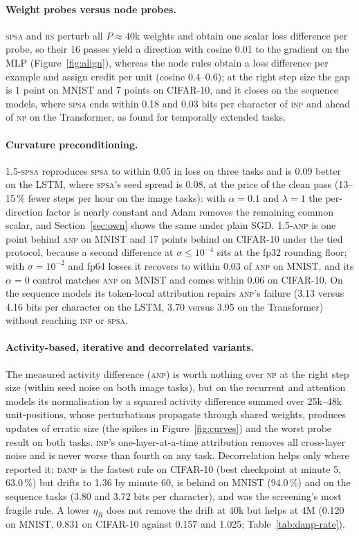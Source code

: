 \documentclass{article}
\newcommand{\method}[1]{\textsc{#1}}
\newcommand{\SPSA}{\method{spsa}}
\newcommand{\SPSAb}{\method{1.5-spsa}}
\newcommand{\RS}{\method{rs}}
\newcommand{\NP}{\method{np}}
\newcommand{\ANP}{\method{anp}}
\newcommand{\ANPb}{\method{1.5-anp}}
\newcommand{\INP}{\method{inp}}
\newcommand{\DANP}{\method{danp}}
\begin{document}
\paragraph{Weight probes versus node probes.}
\SPSA{} and \RS{} perturb all $P\approx40$k weights and obtain one scalar loss
difference per probe, so their 16 passes yield a direction with cosine 0.01 to the
gradient on the MLP (Figure~\ref{fig:align}), whereas the node rules obtain a loss
difference per example and assign credit per unit (cosine 0.4--0.6); at the right step size the gap is 1 point on MNIST and 7 points on CIFAR-10, and it closes on the sequence models, where \SPSA{} ends within 0.18
and 0.03 bits per character of \INP{} and ahead of \NP{} on the Transformer, as
\citet{zuge2023weight} found for temporally extended tasks.

\paragraph{Curvature preconditioning.}
\SPSAb{} reproduces \SPSA{} to within 0.05 in loss on three tasks and is 0.09 better
on the LSTM, where \SPSA{}'s seed spread is 0.08, at the price of the clean pass
(13--15\,\% fewer steps per hour on the image tasks): with
$\alpha=0.1$ and $\lambda=1$ the per-direction factor is nearly constant and Adam
removes the remaining common scalar, and Section~\ref{sec:own} shows the same under
plain SGD. \ANPb{} is one point behind \ANP{} on MNIST and 17 points behind on CIFAR-10 under
the tied protocol, because a second difference at $\sigma\le10^{-4}$ sits at the fp32
rounding floor; with $\sigma=10^{-2}$ and fp64
losses it recovers to within 0.03 of \ANP{} on MNIST, and its $\alpha=0$ control
matches \ANP{} on MNIST and comes within 0.06 on CIFAR-10. On the sequence models its token-local attribution
repairs \ANP{}'s failure (3.13 versus 4.16 bits per character on the LSTM, 3.70 versus
3.95 on the Transformer) without reaching \INP{} or \SPSA{}.

\paragraph{Activity-based, iterative and decorrelated variants.}
The measured activity difference (\ANP{}) is worth nothing over \NP{} at the right
step size (within seed noise on both image tasks), but on the recurrent and attention models its normalisation by a squared
activity difference summed over 25k--48k unit-positions, whose perturbations propagate
through shared weights, produces updates of erratic size (the spikes in
Figure~\ref{fig:curves}) and the worst probe result on both tasks. \INP{}'s one-layer-at-a-time attribution removes all cross-layer noise and is never
worse than fourth on any task. Decorrelation helps only where \citet{dalm2023} reported it: \DANP{} is the fastest rule on CIFAR-10 (best checkpoint at minute 5, 63.0\,\%) but
drifts to 1.36 by minute 60, is behind on MNIST (94.0\,\%) and on the sequence tasks
(3.80 and 3.72 bits per character), and was the screening's most fragile rule. A lower $\eta_R$ does not remove the drift at $40$k but helps at $4$M (0.120 on
MNIST, 0.831 on CIFAR-10 against 0.157 and 1.025; Table~\ref{tab:danp-rate}).
\end{document}
